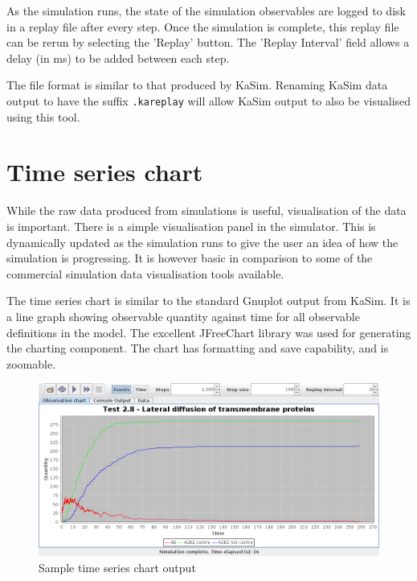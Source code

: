As the simulation runs, the state of the simulation observables are logged to disk in a replay file after every step. Once the simulation is complete, this replay file can be rerun by selecting the 'Replay' button. The 'Replay Interval' field allows a delay (in ms) to be added between each step.

The file format is similar to that produced by KaSim. Renaming KaSim data output to have the suffix \verb|.kareplay| will allow KaSim output to also be visualised using this tool.

\section{Time series chart}

While the raw data produced from simulations is useful, visualisation of the data is important. There is a simple visualisation panel in the simulator. This is dynamically updated as the simulation runs to give the user an idea of how the simulation is progressing. It is however basic in comparison to some of the commercial simulation data visualisation tools available.

The time series chart is similar to the standard Gnuplot output from KaSim. It is a line graph showing observable quantity against time for all observable definitions in the model. The excellent JFreeChart \citep{JFreeChartwebsite} library was used for generating the charting component. The chart has formatting and save capability, and is zoomable.

\begin{figure}[h!]
 \centering
 \includegraphics[scale=0.3]{./images/ChartPane.png}
 \caption{Sample time series chart output}
 \label{fig:chartPane}
\end{figure}
